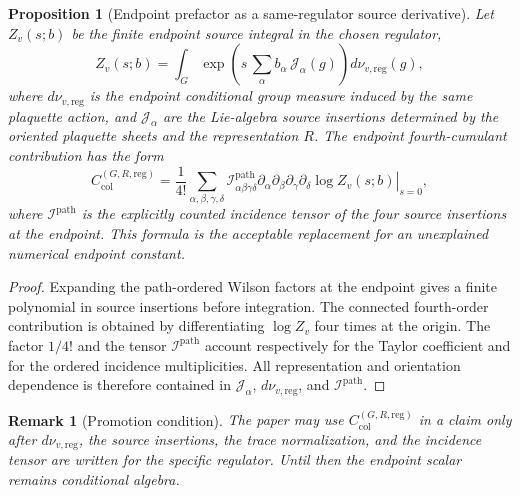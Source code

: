 \documentclass[11pt]{article}
\newtheorem{proposition}[theorem]{Proposition}
\newtheorem{remark}[theorem]{Remark}
\begin{document}
\begin{proposition}[Endpoint prefactor as a same-regulator source derivative]
\label{prop:endpoint-prefactor}
Let \(Z_v(s;b)\) be the finite endpoint source integral in the chosen regulator,
\[
  Z_v(s;b)
  =
  \int_G
  \exp\!\left(
    s\,\sum_\alpha b_\alpha\,\mathcal J_\alpha(g)
  \right)
  d\nu_{v,\mathrm{reg}}(g),
\]
where \(d\nu_{v,\mathrm{reg}}\) is the endpoint conditional group measure induced by the same plaquette action, and \(\mathcal J_\alpha\) are the Lie-algebra source insertions determined by the oriented plaquette sheets and the representation \(R\).  The endpoint fourth-cumulant contribution has the form
\[
  C_{\mathrm{col}}^{(G,R,\mathrm{reg})}
  =
  \frac{1}{4!}
  \sum_{\alpha,\beta,\gamma,\delta}
  \mathcal I_{\alpha\beta\gamma\delta}^{\mathrm{path}}
  \left.
  \partial_{\alpha}\partial_{\beta}\partial_{\gamma}\partial_{\delta}
  \log Z_v(s;b)
  \right|_{s=0},
\]
where \(\mathcal I^{\mathrm{path}}\) is the explicitly counted incidence tensor of the four source insertions at the endpoint.  This formula is the acceptable replacement for an unexplained numerical endpoint constant.
\end{proposition}

\begin{proof}
Expanding the path-ordered Wilson factors at the endpoint gives a finite polynomial in source insertions before integration.  The connected fourth-order contribution is obtained by differentiating \(\log Z_v\) four times at the origin.  The factor \(1/4!\) and the tensor \(\mathcal I^{\mathrm{path}}\) account respectively for the Taylor coefficient and for the ordered incidence multiplicities.  All representation and orientation dependence is therefore contained in \(\mathcal J_\alpha\), \(d\nu_{v,\mathrm{reg}}\), and \(\mathcal I^{\mathrm{path}}\).
\end{proof}

\begin{remark}[Promotion condition]
The paper may use \(C_{\mathrm{col}}^{(G,R,\mathrm{reg})}\) in a claim only after \(d\nu_{v,\mathrm{reg}}\), the source insertions, the trace normalization, and the incidence tensor are written for the specific regulator.  Until then the endpoint scalar remains conditional algebra.
\end{remark}
\end{document}

